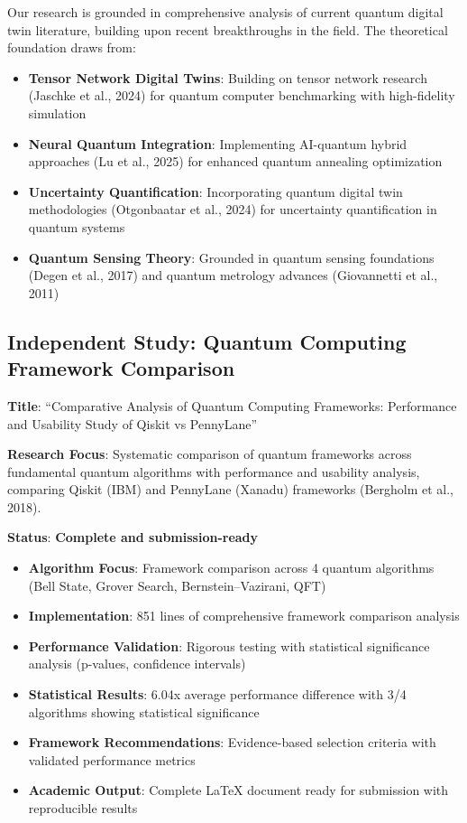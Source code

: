 \documentclass[12pt,a4paper]{article}
\begin{document}
Our research is grounded in comprehensive analysis of current quantum digital twin literature, building upon recent breakthroughs in the field. The theoretical foundation draws from:

\begin{itemize}
    \item \textbf{Tensor Network Digital Twins}: Building on tensor network research (Jaschke et al., 2024) for quantum computer benchmarking with high-fidelity simulation
    \item \textbf{Neural Quantum Integration}: Implementing AI-quantum hybrid approaches (Lu et al., 2025) for enhanced quantum annealing optimization
    \item \textbf{Uncertainty Quantification}: Incorporating quantum digital twin methodologies (Otgonbaatar et al., 2024) for uncertainty quantification in quantum systems
    \item \textbf{Quantum Sensing Theory}: Grounded in quantum sensing foundations (Degen et al., 2017) and quantum metrology advances (Giovannetti et al., 2011)
\end{itemize}

\subsection{Independent Study: Quantum Computing Framework Comparison}

\textbf{Title}: ``Comparative Analysis of Quantum Computing Frameworks: Performance and Usability Study of Qiskit vs PennyLane''

\textbf{Research Focus}: Systematic comparison of quantum frameworks across fundamental quantum algorithms with performance and usability analysis, comparing Qiskit (IBM) and PennyLane (Xanadu) frameworks (Bergholm et al., 2018).

\textbf{Status}: \textcolor{successgreen}{\textbf{Complete and submission-ready}}

\begin{itemize}
    \item \textbf{Algorithm Focus}: Framework comparison across 4 quantum algorithms (Bell State, Grover Search, Bernstein--Vazirani, QFT)
    \item \textbf{Implementation}: 851 lines of comprehensive framework comparison analysis
    \item \textbf{Performance Validation}: Rigorous testing with statistical significance analysis (p-values, confidence intervals)
    \item \textbf{Statistical Results}: 6.04x average performance difference with 3/4 algorithms showing statistical significance  
    \item \textbf{Framework Recommendations}: Evidence-based selection criteria with validated performance metrics
    \item \textbf{Academic Output}: Complete LaTeX document ready for submission with reproducible results
\end{itemize}
\end{document}
